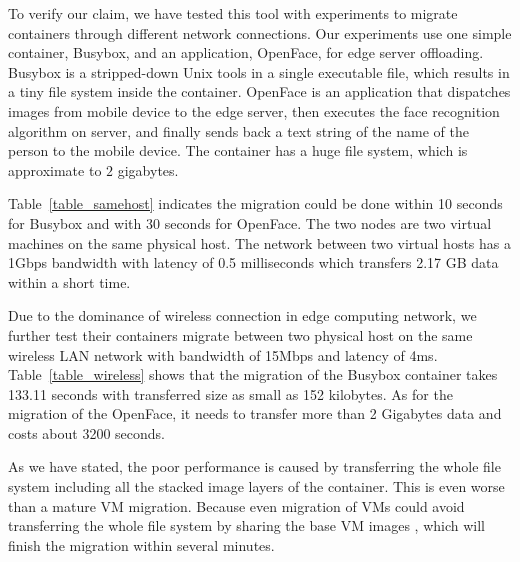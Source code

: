 To verify our claim, we have tested this tool with experiments to migrate containers through different network connections. Our experiments use one simple container, Busybox, and an application, OpenFace, for edge server offloading.  Busybox is a stripped-down Unix tools in a single executable file, which results in a tiny file system inside the container. OpenFace\cite{openface2016} is an application that dispatches images from mobile device to the edge server, then executes the face recognition algorithm on server, and finally sends back a text string of the name of the person to the mobile device. The container has a huge file system, which is approximate to $2$ gigabytes.

Table~\ref{table_samehost} indicates the migration could be done within 10 seconds for Busybox and with 30 seconds for OpenFace. The two nodes are two virtual machines on the same physical host. The network between two virtual hosts has a 1Gbps bandwidth with latency of 0.5 milliseconds which transfers 2.17 GB data within a short time.

Due to the dominance of wireless connection in edge computing network, we further test their containers migrate  between two physical host on the same wireless LAN network with bandwidth of 15Mbps and latency of 4ms. Table~\ref{table_wireless} shows that the migration of the Busybox container takes 133.11 seconds with transferred size as small as 152 kilobytes. As for the migration of the OpenFace, it needs to transfer more than 2 Gigabytes data and  costs about 3200 seconds. 

As we have stated, the poor performance is caused by transferring  the whole file system including all the stacked image layers of the container. This is even worse than a mature VM migration. Because even migration of VMs could avoid transferring the whole file system by sharing the base VM images
    \cite{ha2015vmhandoff}, which will finish the migration within several minutes. 

